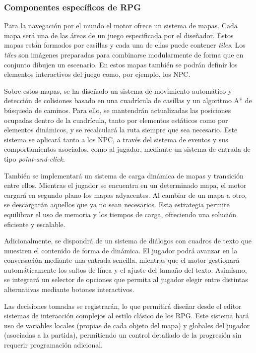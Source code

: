 \subsubsection{Componentes específicos de RPG}

Para la navegación por el mundo el motor ofrece un sistema de mapas. Cada mapa será una de las áreas de un juego especificada por el diseñador. Estos mapas están formados por casillas y cada una de ellas puede contener \textit{tiles}. Los \textit{tiles} son imágenes preparadas para combinarse modularmente de forma que en conjunto dibujen un escenario. En estos mapas también se podrán definir los elementos interactivos del juego como, por ejemplo, los NPC.

\medskip  

Sobre estos mapas, se ha diseñado un sistema de movimiento automático y detección de colisiones basado en una cuadrícula de casillas y un algoritmo A* de búsqueda de caminos. Para ello, se mantendrán actualizadas las posiciones ocupadas dentro de la cuadrícula, tanto por elementos estáticos como por elementos dinámicos, y se recalculará la ruta siempre que sea necesario. Este sistema se aplicará tanto a los NPC, a través del sistema de eventos y sus comportamientos asociados, como al jugador, mediante un sistema de entrada de tipo \textit{point-and-click}.

\medskip

También se implementará un sistema de carga dinámica de mapas y transición entre ellos. Mientras el jugador se encuentra en un determinado mapa, el motor cargará en segundo plano los mapas adyacentes. Al cambiar de un mapa a otro, se descargarán aquellos que ya no sean necesarios. Esta estrategia permite equilibrar el uso de memoria y los tiempos de carga, ofreciendo una solución eficiente y escalable.

\medskip

Adicionalmente, se dispondrá de un sistema de diálogos con cuadros de texto que muestren el contenido de forma de dinámica. El jugador podrá avanzar en la conversación mediante una entrada sencilla, mientras que el motor gestionará automáticamente los saltos de línea y el ajuste del tamaño del texto. Asimismo, se integrará un selector de opciones que permita al jugador elegir entre distintas alternativas mediante botones interactivos.

\smallskip

Las decisiones tomadas se registrarán, lo que permitirá diseñar desde el editor sistemas de interacción complejos al estilo clásico de los RPG. Este sistema hará uso de variables locales (propias de cada objeto del mapa) y globales del jugador (asociadas a la partida), permitiendo un control detallado de la progresión sin requerir programación adicional.

